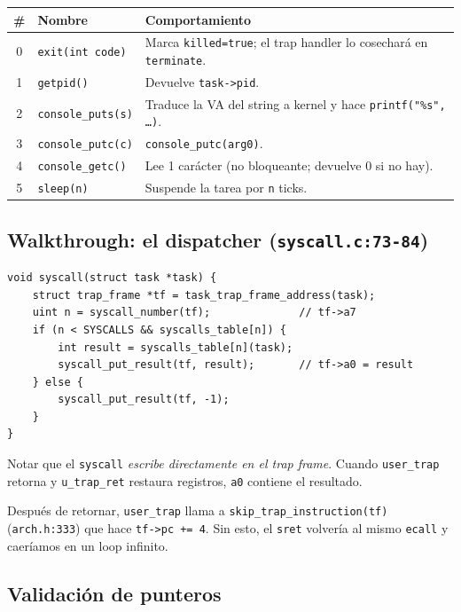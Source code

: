 \documentclass[11pt,a4paper]{article}
\begin{document}
\begin{center}
\small
\begin{tabular}{@{}clp{8cm}@{}}
\toprule
\# & Nombre & Comportamiento \\
\midrule
0 & \texttt{exit(int code)}      & Marca \texttt{killed=true}; el trap handler lo cosechará en \texttt{terminate}. \\
1 & \texttt{getpid()}            & Devuelve \texttt{task->pid}. \\
2 & \texttt{console\_puts(s)}    & Traduce la VA del string a kernel y hace \texttt{printf("\%s", \dots)}. \\
3 & \texttt{console\_putc(c)}    & \texttt{console\_putc(arg0)}. \\
4 & \texttt{console\_getc()}     & Lee 1 carácter (no bloqueante; devuelve 0 si no hay). \\
5 & \texttt{sleep(n)}            & Suspende la tarea por \texttt{n} ticks. \\
\bottomrule
\end{tabular}
\end{center}

\subsection*{Walkthrough: el dispatcher (\texttt{syscall.c:73-84})}

\begin{walkthrough}
\begin{lstlisting}[style=cstyle]
void syscall(struct task *task) {
    struct trap_frame *tf = task_trap_frame_address(task);
    uint n = syscall_number(tf);              // tf->a7
    if (n < SYSCALLS && syscalls_table[n]) {
        int result = syscalls_table[n](task);
        syscall_put_result(tf, result);       // tf->a0 = result
    } else {
        syscall_put_result(tf, -1);
    }
}
\end{lstlisting}

Notar que el \texttt{syscall} \emph{escribe directamente en el trap
frame}. Cuando \texttt{user\_trap} retorna y \texttt{u\_trap\_ret}
restaura registros, \texttt{a0} contiene el resultado.

Después de retornar, \texttt{user\_trap} llama a
\texttt{skip\_trap\_instruction(tf)} (\texttt{arch.h:333}) que hace
\texttt{tf->pc += 4}. Sin esto, el \texttt{sret} volvería al mismo
\texttt{ecall} y caeríamos en un loop infinito.
\end{walkthrough}

\subsection*{Validación de punteros}
\end{document}
